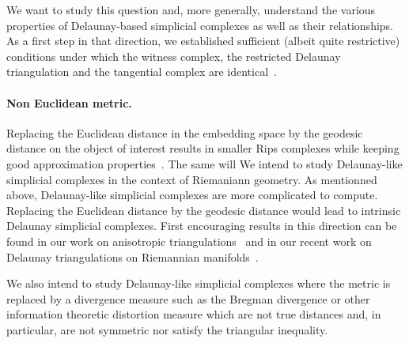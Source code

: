 We want to study this question and, more generally, understand the various properties of Delaunay-based simplicial complexes as well as their relationships. As a  first step in that direction, we established sufficient (albeit quite restrictive) conditions under which the witness complex, the restricted Delaunay triangulation and the tangential complex are identical~\cite{boissonnat2012stab}. 

\paragraph{Non Euclidean metric.}
Replacing the Euclidean distance in the embedding space by the geodesic distance on the object of interest results in smaller Rips complexes while keeping good approximation properties~\cite{dl-clt-2009}. The same will We intend to study Delaunay-like simplicial complexes in the context of Riemaniann geometry. 
As mentionned above, Delaunay-like simplicial complexes are more complicated to compute. Replacing the Euclidean distance by  the geodesic distance would lead to intrinsic Delaunay simplicial complexes. First encouraging results in this direction can be found in our work on anisotropic triangulations~\cite{bwy-luam-08} and in our recent work on Delaunay triangulations on Riemannian manifolds~\cite{boissonnat2012stab}. 


We also intend to study Delaunay-like simplicial complexes where the metric is replaced by a divergence measure such as the Bregman divergence or other information theoretic distortion measure which are not true distances and, in particular, are not symmetric nor satisfy the triangular inequality.


